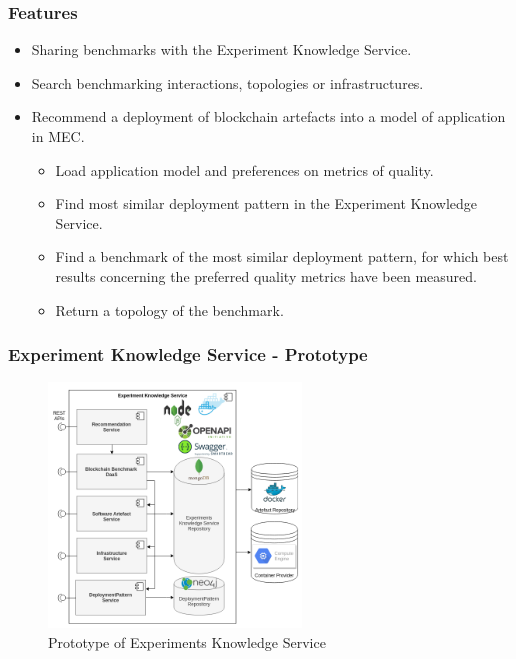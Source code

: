 \documentclass{beamer}
\begin{document}
	\begin{frame}
	\frametitle{Features}
	
	
		\begin{itemize}
			\item Sharing benchmarks with the Experiment Knowledge Service.
			\item Search benchmarking interactions, topologies or infrastructures.
			\item Recommend a deployment of blockchain artefacts into a model of application in \gls{MEC}.
			\begin{itemize}
				\item Load application model and preferences on metrics of quality.
				\item Find most similar deployment pattern in the Experiment Knowledge Service.
				\item Find a benchmark of the most similar deployment pattern, for which best results concerning the preferred quality metrics have been measured.
				\item Return a topology of the benchmark.
			\end{itemize}
		\end{itemize}
		
	\end{frame}

	\begin{frame}
		\frametitle{Experiment Knowledge Service - Prototype}
		
		\begin{figure}
			\centering
			\includegraphics[width=0.6\textwidth]{figures/knowledge_service_architecture_prototype.png}
			\vspace{-0.5cm}
			\caption{Prototype of Experiments Knowledge Service}
			\label{fig:prototype}
		\end{figure}
		
	\end{frame}
	
	
\end{document}
